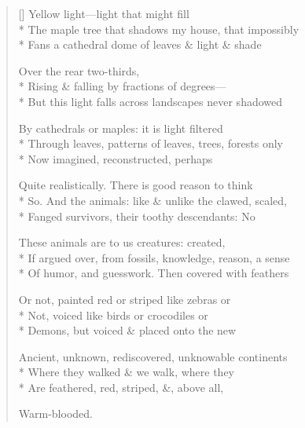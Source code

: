 \label{ch:jurassic_lagoon}
\settowidth{\versewidth}{If argued over, from fossils, knowledge, reason, a sense}
\begin{verse}[\versewidth]
Yellow light---light that might fill\\*
The maple tree that shadows my house, that impossibly\\*
Fans a cathedral dome of leaves \& light \& shade

Over the rear two-thirds, \\*
Rising \& falling by fractions of degrees--- \\*
But this light falls across landscapes never shadowed

By cathedrals or maples: it is light filtered\\*
Through leaves, patterns of leaves, trees, forests only\\*
Now imagined, reconstructed, perhaps

Quite realistically.   There is good reason to think\\*
So.  And the animals: like \& unlike the clawed, scaled,\\*
Fanged survivors, their toothy descendants: No

These animals are to us creatures: created,\\*
If argued over, from fossils, knowledge, reason, a sense\\*
Of humor, and guesswork. Then covered with feathers

Or not, painted red or striped like zebras or\\*
Not, voiced like birds or crocodiles or\\*
Demons, but voiced \& placed onto the new

Ancient, unknown, rediscovered, unknowable continents\\*
Where they walked \& we walk, where they\\*
Are feathered, red, striped, \&, above all, 

Warm-blooded.
\end{verse}
